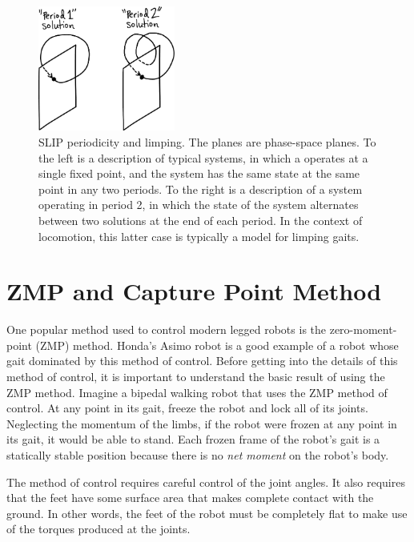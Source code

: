 \begin{figure}[h]		%
\begin{centering}
\includegraphics[width=0.4\textwidth]{Figures/SLIPPeriodic}\par
\end{centering}
\caption[Diagram: SLIP Periodicity and Limping]{SLIP periodicity and limping. The planes are phase-space planes. To the left is a description of typical systems, in which a operates at a single fixed point, and the system has the same state at the same point in any two periods. To the right is a description of a system operating in period 2, in which the state of the system alternates between two solutions at the end of each period. In the context of locomotion, this latter case is typically a model for limping gaits.}
\label{fig:SLIPPeriodic}
\end{figure}
%

\section{ZMP and Capture Point Method} %
\label{sec:ZMPAndCapturePointMethod}

One popular method used to control modern legged robots is the zero-moment-point (ZMP) method. Honda's Asimo robot is a good example of a robot whose gait dominated by this method of control. Before getting into the details of this method of control, it is important to understand the basic result of using the ZMP method. Imagine a bipedal walking robot that uses the ZMP method of control. At any point in its gait, freeze the robot and lock all of its joints. Neglecting the momentum of the limbs, if the robot were frozen at any point in its gait, it would be able to stand. Each frozen frame of the robot's gait is a statically stable position because there is no \textit{net moment} on the robot's body. 

The method of control requires careful control of the joint angles. It also requires that the feet have some surface area that makes complete contact with the ground. In other words, the feet of the robot must be completely flat to make use of the torques produced at the joints. 

